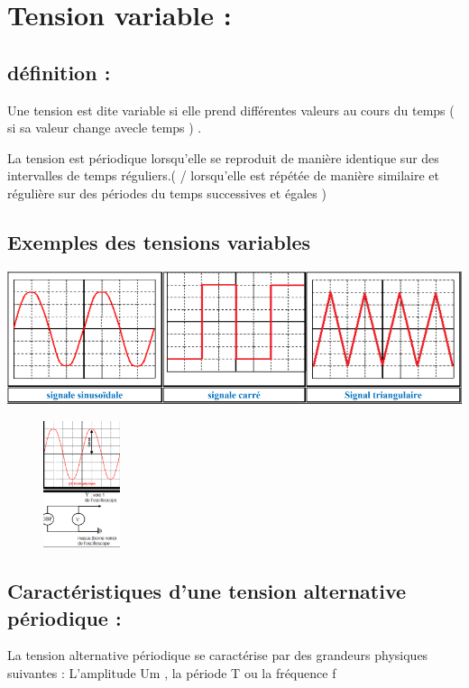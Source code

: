 \documentclass[12pt]{article}
\begin{document}
\section{Tension variable : }
\subsection{définition : }
Une tension est dite variable si elle prend différentes valeurs au cours du temps (  si sa valeur change avecle temps ) .

La tension est périodique lorsqu’elle se reproduit de manière identique sur des intervalles de temps
réguliers.( / lorsqu’elle est répétée de manière similaire et régulière sur des périodes du temps successives
et égales )

\subsection{Exemples des tensions variables}

\begin{center}
\includegraphics[width=1\textwidth]{./img/img_signal_types_06.png}
\end{center}

\begin{figure}
    \vspace{-1cm}
\includegraphics[width=0.2\textwidth]{./img/img_u_eff_sin_07.png}
\end{figure}


\subsection{Caractéristiques d’une tension alternative périodique : }
La tension alternative périodique se caractérise par des grandeurs physiques
suivantes : L’amplitude Um , la période T ou la fréquence f
\end{document}
